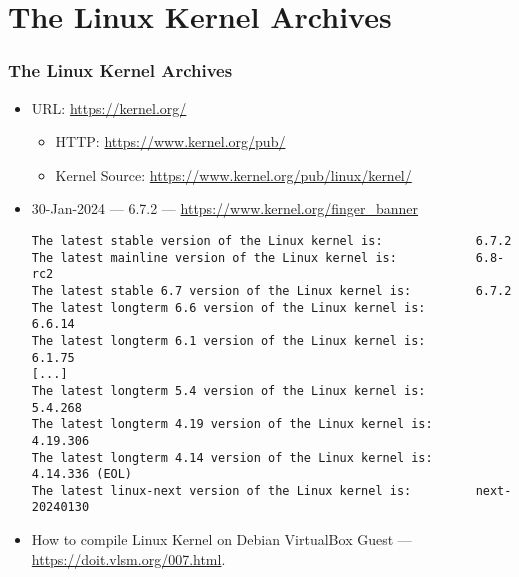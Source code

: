 \documentclass[aspectratio=169, xcolor=table, notheorems, hyperref={pdfpagelabels=false}]{beamer}
\begin{document}
\section{The Linux Kernel Archives}
\begin{frame}[fragile]
\frametitle{The Linux Kernel Archives}
\begin{itemize}
\item URL: \url{https://kernel.org/}
\begin{itemize}
\item HTTP: \url{https://www.kernel.org/pub/}
\item Kernel Source: \url{https://www.kernel.org/pub/linux/kernel/}
\end{itemize}
\item 30-Jan-2024 --- 6.7.2 --- \url{https://www.kernel.org/finger_banner}
\begin{lstlisting}[basicstyle=\ttfamily\small]
The latest stable version of the Linux kernel is:             6.7.2
The latest mainline version of the Linux kernel is:           6.8-rc2
The latest stable 6.7 version of the Linux kernel is:         6.7.2
The latest longterm 6.6 version of the Linux kernel is:       6.6.14
The latest longterm 6.1 version of the Linux kernel is:       6.1.75
[...]
The latest longterm 5.4 version of the Linux kernel is:       5.4.268
The latest longterm 4.19 version of the Linux kernel is:      4.19.306
The latest longterm 4.14 version of the Linux kernel is:      4.14.336 (EOL)
The latest linux-next version of the Linux kernel is:         next-20240130
\end{lstlisting}
\item How to compile Linux Kernel on Debian VirtualBox Guest --- \url{https://doit.vlsm.org/007.html}.
\end{itemize}
\end{frame}

\end{document}
